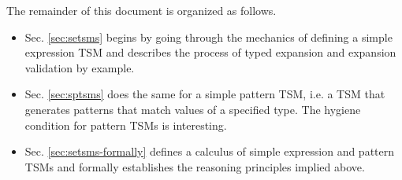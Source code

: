 \documentclass[acmlarge,review,anonymous]{acmart}\settopmatter{printfolios=true}
\begin{document}


The remainder of this document is organized as follows.
\begin{itemize}
\item Sec. \ref{sec:setsms} begins by going through the mechanics of defining a {simple expression TSM} and describes the process of typed expansion and expansion validation by example.
\item Sec. \ref{sec:sptsms} does the same for a {simple pattern TSM}, i.e. a TSM that generates patterns that match values of a specified type. The hygiene condition for pattern TSMs is interesting.
\item Sec. \ref{sec:setsms-formally} defines a calculus of simple expression and pattern TSMs and formally establishes the reasoning principles implied above.



\end{itemize}
\end{document}
